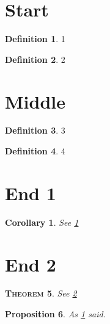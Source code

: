 \documentclass{article}
\newtheorem{thm}{\textsc{Theorem}}[subsection]
\newtheorem{prop}[thm]{Proposition}
\newtheorem{cor}{Corollary}[thm]
\theoremstyle{definition}
\newtheorem{defn}[thm]{Definition}
\begin{document}
\section{Start}

\begin{defn}
	\label{def:1}
	1
\end{defn}

\begin{defn}
	\label{def:2}
	2
\end{defn}

\section{Middle}

\begin{defn}
	\label{def:3}
	3
\end{defn}

\begin{defn}
	\label{def:4}
	4
\end{defn}

\section{End 1}

\begin{cor}
	\label{cor:back1}
	See \ref{def:1}
\end{cor}

\section{End 2}

\begin{thm}
	\label{cor:back2}
	See \ref{def:2}
\end{thm}
\begin{prop}
	\label{prop:backcor}
	As \ref{cor:back1} said.
\end{prop}
\end{document}
